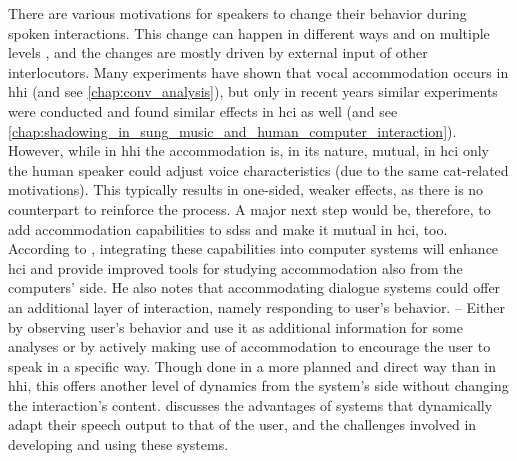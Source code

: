 There are various motivations for speakers to change their behavior during spoken interactions.
This change can happen in different ways and on multiple levels \citep[][and see \cref{chap:phonetic_convergence} for more details]{Gallois2015CAT, Shepard2001CAT}, and the changes are mostly driven by external input of other interlocutors.
Many experiments have shown that vocal accommodation occurs in \ac{hhi} (and see \cref{chap:conv_analysis}), but only in recent years similar experiments were conducted and found similar effects in \ac{hci} as well (and see \cref{chap:shadowing_in_sung_music_and_human_computer_interaction}).
However, while in \ac{hhi} the accommodation is, in its nature, mutual, in \ac{hci} only the human speaker could adjust voice characteristics (due to the same \ac{cat}-related motivations).
This typically results in one-sided, weaker effects, as there is no counterpart to reinforce the process.
A major next step would be, therefore, to add accommodation capabilities to \acp{sds} and make it mutual in \ac{hci}, too.
According to \citet{Weise2017towards}, integrating these capabilities into computer systems will enhance \ac{hci} and provide improved tools for studying accommodation also from the computers' side.
He also notes that accommodating dialogue systems could offer an additional layer of interaction, namely responding to user's behavior. -- Either by observing user's behavior and use it as additional information for some analyses or by actively making use of accommodation to encourage the user to speak in a specific way.
Though done in a more planned and direct way than in \ac{hhi}, this offers another level of dynamics from the system's side without changing the interaction's content.
\citet{Oviatt2004adaptive} discusses the advantages of systems that dynamically adapt their speech output to that of the user, and the challenges involved in developing and using these systems.

